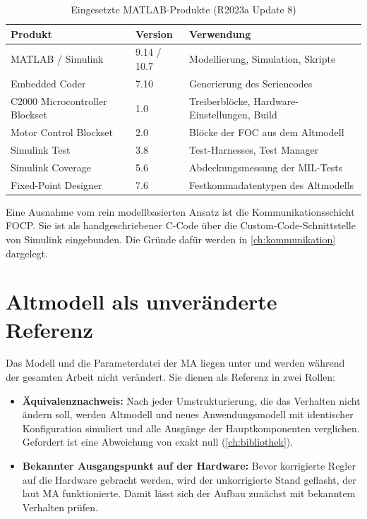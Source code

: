 \begin{table}[htbp]
  \centering
  \caption{Eingesetzte MATLAB-Produkte (R2023a Update 8)}
  \label{tab:toolchain}
  \small
  \begin{tabular}{@{}llp{70mm}@{}}
    \toprule
    Produkt & Version & Verwendung \\
    \midrule
    MATLAB / Simulink & 9.14 / 10.7 & Modellierung, Simulation, Skripte \\
    Embedded Coder & 7.10 & Generierung des Seriencodes \\
    C2000 Microcontroller Blockset & 1.0 & Treiberblöcke, Hardware-Einstellungen, Build \\
    Motor Control Blockset & 2.0 & Blöcke der \ac{FOC} aus dem Altmodell \\
    Simulink Test & 3.8 & Test-Harnesses, Test Manager \\
    Simulink Coverage & 5.6 & Abdeckungsmessung der \ac{MIL}-Tests \\
    Fixed-Point Designer & 7.6 & Festkommadatentypen des Altmodells \\
    \bottomrule
  \end{tabular}
\end{table}

Eine Ausnahme vom rein modellbasierten Ansatz ist die Kommunikationsschicht \ac{FOCP}. Sie
ist als handgeschriebener C-Code über die Custom-Code-Schnittstelle von Simulink eingebunden.
Die Gründe dafür werden in \cref{ch:kommunikation} dargelegt.

\section{Altmodell als unveränderte Referenz}
\label{sec:referenz}

Das Modell  und die Parameterdatei  der \ac{MA}
liegen unter  und werden während der gesamten Arbeit nicht
verändert. Sie dienen als Referenz in zwei Rollen:

\begin{itemize}
  \item \textbf{Äquivalenznachweis:} Nach jeder Umstrukturierung, die das Verhalten nicht
    ändern soll, werden Altmodell und neues Anwendungsmodell mit identischer Konfiguration
    simuliert und alle Ausgänge der Hauptkomponenten verglichen. Gefordert ist eine
    Abweichung von exakt null (\cref{ch:bibliothek}).
  \item \textbf{Bekannter Ausgangspunkt auf der Hardware:} Bevor korrigierte Regler auf die
    Hardware gebracht werden, wird der unkorrigierte Stand geflasht, der laut \ac{MA}
    funktionierte. Damit lässt sich der Aufbau zunächst mit bekanntem Verhalten prüfen.
\end{itemize}

